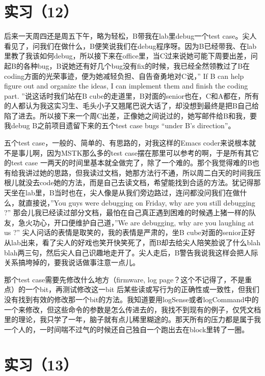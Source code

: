 \documentclass[12pt]{book}
\begin{document}
\section{实习（12）}
\label{sec-5-15}

后来一天周四还是周五下午，略为轻松，B带我在lab里debug一个test case。尖人看见了，问我们在做什么，B便笑说我们在debug程序呀。因为B已经带我、在lab里教了我该如何debug，所以接下来在office里，当C过来说她可能下周要出差，问起B的各种bug，B说她还有好几个bug没有fix的时候，我已经全然领教过了B在coding方面的光荣事迹，便为她减轻负担、自告奋勇地对C说，” If B can help figure out and organize the ideas, I can implement them and finish the coding part.  ”说这话时我们站在B cube的走道里，B对面的senior也在，C和A都在，所有的人都认为我这实习生、毛头小子又翘尾巴说大话了，却没想到最终是把B自己给陷了进去。所以接下来一个周C出差，正像她之间说过的，她写邮件给B和我，要我debug B之前项目遗留下来的五个test case bugs “under B’s direction”。

五个test case，一般的、简单的、有思路的，对我这样的Emacs coder来说根本就不是事儿啊，因为MSTK那么多的test case摆在那里可以参考的啊，于是所有其它的test case 一两天的时间里基本就全做完了，除了一个难的。那个我觉得难的B也有给我讲过她的思路，但我读过文档，她那方法行不通，所以周二白天的时间我压根儿就没去code她的方法，而是自己去读文档，希望能找到合适的方法。犹记得那天坐在lab里，B当时也在，尖人像是从我们旁边路过，连问都没问我们在做什么，就直接说，”You guys were debugging on Friday, why are you still debugging ?” 那会儿我已经读过部分文档，最怕在自己真正遇到困难的时候遇上猪一样的队友，急火功心，开口便维护自己道，”We are debugging, why are you laughing at us ?” 尖人问话的表情是取笑的，我的表情是严肃的，坐B cube对面的senior正好从lab出来，看了尖人的好戏也笑开快笑死了，而B却去给尖人陪笑脸说了什么blah blah两三句，然后尖人自己识趣地走开了。尖人走后，B警告我说我这样会把人际关系搞垮掉的，要我说话做事注意一点儿。

那个test case需要先修改什么地方（firmware, log page？这个不记得了，不是重点）的一个bit，再测试修改这一bit 后某些读或写行为的正确性或一致性，但我们没有找到有效的修改那一个bit的方法。我知道要用logSense或者logCommand中的一个来修改，但这些命令的参数是怎么传进去的，我找不到现有的例子，仅凭文档里的理论，我只学了一年，脑子就有点儿稀里糊途的。那天所有的压力都是属于我一个人的，一时间喘不过气的时候还自己独自一个跑出去在block里转了一圈。


\section{实习（13）}
\label{sec-5-16}
\end{document}
